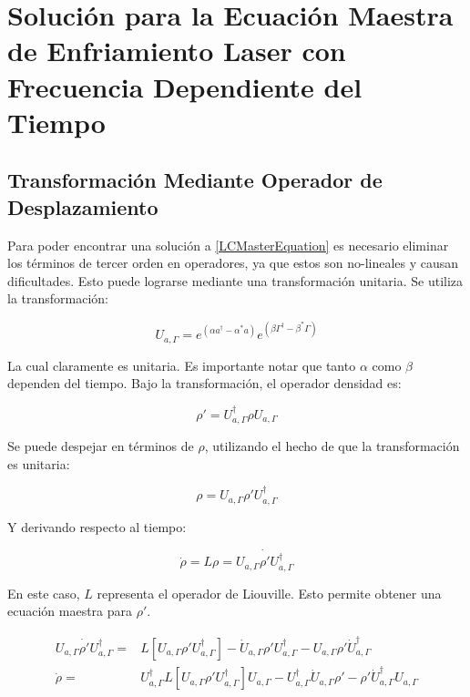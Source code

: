 \documentclass[a4paper,10pt]{report}
\begin{document}
\chapter{Solución para la Ecuación Maestra de Enfriamiento Laser con Frecuencia Dependiente del Tiempo}

\section{Transformación Mediante Operador de Desplazamiento}

Para poder encontrar una solución a \ref{LCMasterEquation} es necesario eliminar los términos de tercer orden en operadores, ya que estos son no-lineales y causan dificultades. Esto puede lograrse mediante una transformación unitaria. Se utiliza la transformación:

\begin{equation}
U_{a,\Gamma} = e^{(\alpha a^\dagger - \alpha^*a)}e^{(\beta \Gamma^\dagger - \beta^*\Gamma)}
\end{equation}

La cual claramente es unitaria. Es importante notar que tanto $\alpha$ como $\beta$ dependen del tiempo. Bajo la transformación, el operador densidad es:

\begin{equation}
\rho' = U_{a,\Gamma}^\dagger \rho U_{a,\Gamma}
\end{equation}

Se puede despejar en términos de $\rho$, utilizando el hecho de que la transformación es unitaria:

\begin{equation}
\rho = U_{a,\Gamma} \rho' U_{a,\Gamma}^\dagger
\end{equation}

Y derivando respecto al tiempo:

\begin{equation}
\dot{\rho} = L\rho = \dot{U_{a,\Gamma} \rho' U_{a,\Gamma}^\dagger}
\end{equation}

En este caso, $L$ representa el operador de Liouville. Esto permite obtener una ecuación maestra para $\rho'$. 

\begin{align}
 U_{a,\Gamma} \dot{\rho'} U_{a,\Gamma}^\dagger =& L[U_{a,\Gamma} \rho' U_{a,\Gamma}^\dagger] - \dot{U}_{a,\Gamma}\rho'U_{a,\Gamma}^\dagger -U_{a,\Gamma} \rho' \dot{U}_{a,\Gamma}^\dagger\\
\dot{\rho} =& U_{a,\Gamma}^\dagger L[U_{a,\Gamma} \rho' U_{a,\Gamma}^\dagger]U_{a,\Gamma}-U_{a,\Gamma}^\dagger\dot{U}_{a,\Gamma}\rho'-\rho'\dot{U}_{a,\Gamma}^\dagger U_{a,\Gamma}
\end{align}
\end{document}
